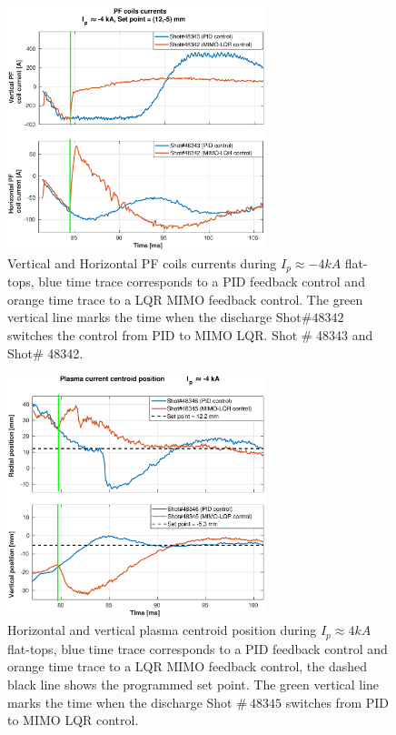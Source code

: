 \begin{figure}
	\centering
	\includegraphics[width=0.67\textwidth]{Chp5/PIDvsMIMO_343_342_curr_2.eps}
	\caption{ Vertical and Horizontal PF coils currents during  $I_p\approx -4kA$  flat-tops, blue time trace corresponds to a PID feedback control and orange time trace to a LQR MIMO feedback control. The green vertical line marks the time  when the  discharge Shot$\# 48342$ switches the control from PID to MIMO LQR. Shot $\#$ 48343 and Shot$\#$ 48342.}
\end{figure}

\begin{figure}
	\centering
	\includegraphics[width=0.67\textwidth]{Chp5/PIDvsMIMO_346_345_2.eps}
	\caption{Horizontal and vertical plasma centroid position during  $I_p\approx 4kA$  flat-tops, blue time trace corresponds to a PID feedback control and orange time trace to a LQR MIMO feedback control, the dashed black line shows the programmed set point. The green vertical line marks the time  when the  discharge Shot $\# ~48345$ switches  from PID to MIMO LQR control.}
\end{figure}

